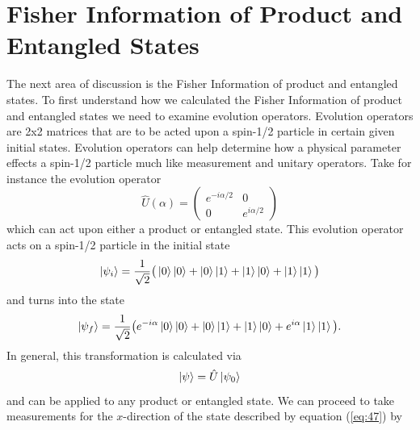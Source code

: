 \documentclass[twocolumn]{article}
\begin{document}
\section*{Fisher Information of Product and Entangled States}
The next area of discussion is the Fisher Information of product and entangled states. To first understand how we calculated the Fisher Information of product and entangled states we need to examine evolution operators. Evolution operators are 2x2 matrices that are to be acted upon a spin-1/2 particle in certain given initial states. Evolution operators can help determine how a physical parameter effects a spin-1/2 particle much like measurement and unitary operators. Take for instance the evolution operator
\begin{equation} \label{eq:45}
\hat{U}(\alpha)=
\begin{pmatrix}
e^{-i\alpha/2} & 0 \\
0 & e^{i\alpha/2}
\end{pmatrix}
\end{equation}
which can act upon either a product or entangled state. This evolution operator acts on a spin-1/2 particle in the initial state
\begin{equation} \label{eq:46}
\ket{\psi_i}=\frac{1}{\sqrt{2}}\big(\ket{0}\ket{0}+\ket{0}\ket{1}+\ket{1}\ket{0}+\ket{1}\ket{1}\big)
\end{equation}
and turns into the state
\begin{equation} \label{eq:47}
\ket{\psi_f}=\frac{1}{\sqrt{2}}\big(e^{-i\alpha}\ket{0}\ket{0}+\ket{0}\ket{1}+\ket{1}\ket{0}+e^{i\alpha}\ket{1}\ket{1}\big).
\end{equation}
In general, this transformation is calculated via
\begin{equation} \label{eq:48}
\ket{\psi}=\hat{U}\ket{\psi_0}
\end{equation}
and can be applied to any product or entangled state. We can proceed to take measurements for the $x$-direction of the state described by equation (\ref{eq:47}) by
\end{document}
